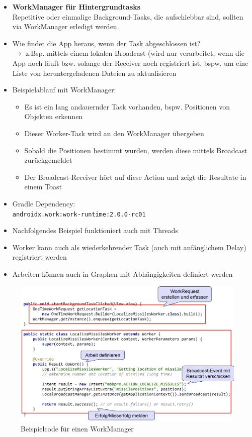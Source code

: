 \documentclass[a4paper]{article}
\begin{document}
	\begin{itemize}
		\item \textbf{WorkManager für Hintergrundtasks}\\
				Repetitive oder einmalige Background-Tasks, die aufschiebbar sind, sollten via WorkManager erledigt werden.
				
		\item Wie findet die App heraus, wenn der Task abgeschlossen ist?\\
		$\rightarrow$ z.Bsp. mittels einem lokalen Broadcast (wird nur verarbeitet, wenn die App noch läuft bzw. solange der Receiver noch registriert ist, bspw. um eine Liste von heruntergeladenen Dateien zu aktualisieren
		
		\item Beispielablauf mit WorkManager:
		\begin{itemize}
			\item Es ist ein lang andauernder Task vorhanden, bspw. Positionen von Objekten erkennen
			
			\item Dieser Worker-Task wird an den WorkManager übergeben
			
			\item Sobald die Positionen bestimmt wurden, werden diese mittels Broadcast zurückgemeldet
			
			\item Der Broadcast-Receiver hört auf diese Action und zeigt die Resultate in einem Toast
		\end{itemize}
	
	\item Gradle Dependency:\\
			\texttt{androidx.work:work-runtime:2.0.0-rc01}
			
	\item Nachfolgendes Beispiel funktioniert auch mit Threads 
	
	\item Worker kann auch als wiederkehrender Task (auch mit anfänglichem Delay) registriert werden
	
	\item Arbeiten können auch in Graphen mit Abhängigkeiten definiert werden
	
	\end{itemize}

	\begin{figure}[!htb]
		\centering
		\includegraphics[width=.8\textwidth]{img/workmanager_beispiel.png}
		\caption{Beispielcode für einen WorkManager}
		\label{fig:workmanager_beispiel}
	\end{figure}
		
\end{document}
